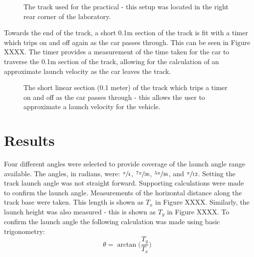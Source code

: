 \documentclass[a4paper]{article}
\begin{document}
\begin{figure}[h]
\begin{minipage}[t]{0.45\textwidth}
		\caption{The track used for the practical - this setup was located in the right rear corner of the laboratory.}
	\end{minipage}
\end{figure}

Towards the end of the track, a short 0.1$\si{\meter}$ section of the track is fit with a timer which trips on and off again as the car passes through. This can be seen in Figure XXXX. The timer provides a measurement of the time taken for the car to traverse the 0.1$\si{\meter}$ section of the track, allowing for the calculation of an approximate launch velocity as the car leaves the track.
\begin{figure}[h]
	\centering
	\caption{The short linear section (0.1 meter) of the track which trips a timer on and off as the car passes through - this allows the user to approximate a launch velocity for the vehicle.}
\end{figure}

\newpage

\section{Results}
Four different angles were selected to provide coverage of the launch angle range available. The angles, in radians, were: $\sfrac{\pi}{4}$, $\sfrac{7\pi}{36}$, $\sfrac{5\pi}{36}$, and $\sfrac{\pi}{12}$. Setting the track launch angle was not straight forward. Supporting calculations were made to confirm the launch angle. Measurements of the horizontal distance along the track base were taken. This length is shown as $T_x$ in Figure XXXX. Similarly, the launch height was also measured - this is shown as $T_y$ in Figure XXXX. To confirm the launch angle the following calculation was made using basic trigonometry:
\begin{equation}
\theta = \arctan\bigg(\frac{T_y}{T_x}\bigg)
\end{equation}
\end{document}
